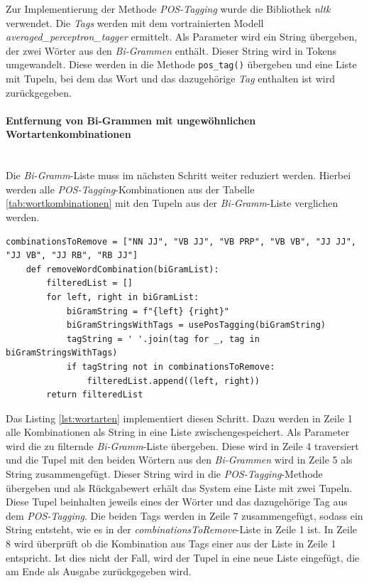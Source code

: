 Zur Implementierung der Methode \emph{POS-Tagging} wurde die Bibliothek \emph{nltk} verwendet. Die \emph{Tags} werden mit dem vortrainierten Modell \emph{averaged\_perceptron\_tagger} ermittelt.
Als Parameter wird ein String übergeben, der zwei Wörter aus den \emph{Bi-Grammen} enthält. Dieser String wird in Tokens umgewandelt. Diese werden in die Methode \lstinline{pos_tag()}
übergeben und eine Liste mit Tupeln, bei dem das Wort und das dazugehörige \emph{Tag} enthalten ist wird zurückgegeben.
\paragraph{Entfernung von Bi-Grammen mit ungewöhnlichen Wortartenkombinationen}\mbox{}\\
Die \emph{Bi-Gramm}-Liste muss im nächsten Schritt weiter reduziert werden. Hierbei werden alle \emph{POS-Tagging}-Kombinationen aus der Tabelle \ref{tab:wortkombinationen} mit den Tupeln aus der \emph{Bi-Gramm}-Liste verglichen werden.
\begin{lstlisting}[caption={Implementation der Filterung von Wortartenkombinationen}, label=lst:wortarten]
	combinationsToRemove = ["NN JJ", "VB JJ", "VB PRP", "VB VB", "JJ JJ", "JJ VB", "JJ RB", "RB JJ"]
	def removeWordCombination(biGramList):
		filteredList = []
		for left, right in biGramList:
			biGramString = f"{left} {right}"
			biGramStringsWithTags = usePosTagging(biGramString)
			tagString = ' '.join(tag for _, tag in biGramStringsWithTags)
			if tagString not in combinationsToRemove:
				filteredList.append((left, right))
		return filteredList
\end{lstlisting}
Das Listing \ref{lst:wortarten} implementiert diesen Schritt. Dazu werden in Zeile 1 alle Kombinationen als String in eine Liste zwischengespeichert. Als Parameter wird die zu filternde \emph{Bi-Gramm}-Liste übergeben. Diese wird in Zeile 4 traversiert und die Tupel mit den beiden Wörtern aus den \emph{Bi-Grammen} wird in Zeile 5 als String zusammengefügt. Dieser String wird in die \emph{POS-Tagging}-Methode übergeben und als Rückgabewert erhält das System eine Liste mit zwei Tupeln. Diese Tupel beinhalten jeweils eines der Wörter und das dazugehörige Tag aus dem \emph{POS-Tagging}. Die beiden Tags werden in Zeile 7 zusammengefügt, sodass ein String entsteht, wie es in der \emph{combinationsToRemove}-Liste in Zeile 1 ist. In Zeile 8 wird überprüft ob die Kombination aus Tags einer aus der Liste in Zeile 1 entspricht. Ist dies nicht der Fall, wird der Tupel in eine neue Liste eingefügt, die am Ende als Ausgabe zurückgegeben wird.
